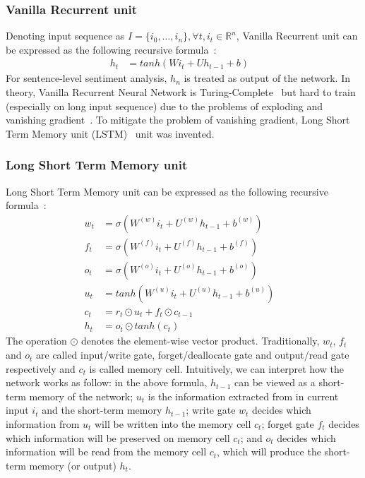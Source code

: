 \subsubsection{Vanilla Recurrent unit}\label{sec:vanilla-rnn}
Denoting input sequence as \(I = \{i_0,\ldots,i_n\}, \forall t, i_t \in \mathbb{R}^n\), Vanilla Recurrent unit can be expressed as the following recursive formula~\cite{treeLSTM}:
\begin{align}
h_t &= tanh(Wi_t + Uh_{t-1} + b)&
\end{align}
For sentence-level sentiment analysis, \(h_n\) is treated as output of the network.
In theory, Vanilla Recurrent Neural Network is Turing-Complete~\cite{rnn-turing-complete} but hard to train (especially on long input sequence) due to the problems of exploding and vanishing gradient~\cite{Bengio1994}.
To mitigate the problem of vanishing gradient, Long Short Term Memory unit (LSTM)~\cite{originLSTM} unit was invented.
\subsubsection{Long Short Term Memory unit}\label{sec:lstm}
Long Short Term Memory unit can be expressed as the following recursive formula~\cite{treeLSTM}:
\begin{align}
w_t &= \sigma\left(W^{(w)}i_t + U^{(w)}h_{t-1} + b^{(w)}\right) \label{eq:lstm-input-gate}&\\
f_t &= \sigma\left(W^{(f)}i_t + U^{(f)}h_{t-1} + b^{(f)}\right) \label{eq:lstm-forget-gate}&\\
o_t &= \sigma\left(W^{(o)}i_t + U^{(o)}h_{t-1} + b^{(o)}\right) \label{eq:lstm-output-gate}&\\
u_t &= tanh\left(W^{(u)}i_t + U^{(u)}h_{t-1} + b^{(u)}\right) \label{eq:lstm-update-gate}&\\
c_t &= r_t \odot u_t + f_t \odot c_{t-1} \label{eq:longterm-mem}&\\
h_t &= o_t \odot tanh(c_t) \label{eq:temperal-mem}&
\end{align}
The operation \(\odot\) denotes the element-wise vector product.
Traditionally, \(w_t\), \(f_t\) and \(o_t\) are called input/write gate, forget/deallocate gate and output/read gate respectively and \(c_t\) is called memory cell.
Intuitively, we can interpret how the network works as follow:
in the above formula, \(h_{t-1}\) can be viewed as a short-term memory of the network;
\(u_t\) is the information extracted from in current input \(i_t\) and the short-term memory \(h_{t-1}\);
write gate \(w_t\) decides which information from \(u_t\) will be written into the memory cell \(c_t\);
forget gate \(f_t\) decides which information will be preserved on memory cell \(c_t\);
and \(o_t\) decides which information will be read from the memory cell \(c_t\), which will produce the short-term memory (or output) \(h_t\).
